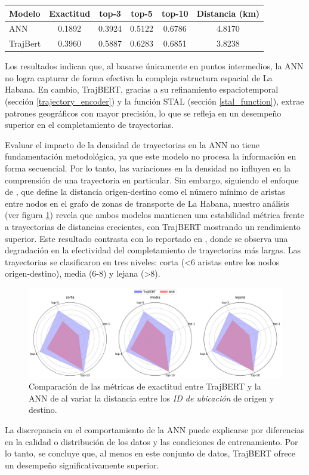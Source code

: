\begin{table}[ht]
\centering
\begin{tabular}{|l|c|c|c|c|c|}
\hline
\textbf{Modelo} & \textbf{Exactitud} & \textbf{top-3} & \textbf{top-5} & \textbf{top-10} & \textbf{Distancia (km)} \\ \hline
ANN             & 0.1892                & 0.3924            & 0.5122            &  0.6786            & 4.8170                  \\ \hline
TrajBert        & 0.3960                & 0.5887            & 0.6283            & 0.6851             & 3.8238                  \\ \hline
\end{tabular}
\label{tab:etecsa_model_comparison}
\end{table}

Los resultados indican que, al basarse únicamente en puntos intermedios, la ANN no logra capturar de forma efectiva la compleja estructura espacial de La Habana. En cambio, TrajBERT, gracias a su refinamiento espaciotemporal (sección \ref{trajectory_encoder}) y la función STAL (sección \ref{stal_function}), extrae patrones geográficos con mayor precisión, lo que se refleja en un desempeño superior en el completamiento de trayectorias.

Evaluar el impacto de la densidad de trayectorias en la ANN no tiene fundamentación metodológica, ya que este modelo no procesa la información en forma secuencial. Por lo tanto, las variaciones en la densidad no influyen en la comprensión de una trayectoria en particular. Sin embargo, siguiendo el enfoque de \cite{rodriguez2022movilidad}, que define la distancia origen-destino como el número mínimo de aristas entre nodos en el grafo de zonas de transporte de La Habana, nuestro análisis (ver figura \ref{fig:distance_variability}) revela que ambos modelos mantienen una estabilidad métrica frente a trayectorias de distancias crecientes, con TrajBERT mostrando un rendimiento superior. Este resultado contrasta con lo reportado en \cite{rodriguez2022movilidad}, donde se observa una degradación en la efectividad del completamiento de trayectorias más largas. Las trayectorias se clasificaron en tres niveles: corta (<6 aristas entre los nodos origen-destino), media (6-8) y lejana (>8).

\begin{figure}[!htb] \centering \includegraphics[width=1\textwidth]{Graphics/distance_variability.png} \caption{Comparación de las métricas de exactitud entre TrajBERT y la ANN de \cite{rodriguez2022movilidad} al variar la distancia entre los \textit{ID de ubicación} de origen y destino.} \label{fig:distance_variability} 
\end{figure}

La discrepancia en el comportamiento de la ANN puede explicarse por diferencias en la calidad o distribución de los datos y las condiciones de entrenamiento. Por lo tanto, se concluye que, al menos en este conjunto de datos, TrajBERT ofrece un desempeño significativamente superior.